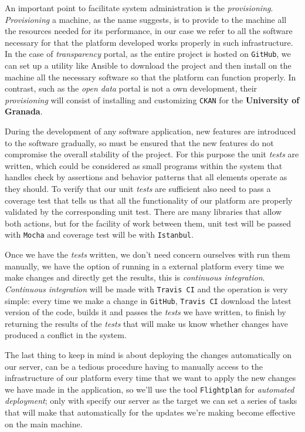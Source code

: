 {{\bigskip
An important point to facilitate system administration is the \textit{provisioning}. \textit{Provisioning} a machine, as the name suggests, is to provide to the machine all the resources needed for its performance, in our case we refer to all the software necessary for that the platform developed works properly in such infrastructure. In the case of \textit{transparency} portal, as the entire project is hosted on {\tt GitHub}, we can set up a utility like Ansible to download the project and then install on the machine all the necessary software so that the platform can function properly. In contrast, such as the \textit{open data} portal is not a own development, their \textit{provisioning} will consist of installing and customizing {\tt CKAN} for the \textbf {University of Granada}.

\bigskip
During the development of any software application, new features are introduced to the software gradually, so must be ensured that the new features do not compromise the overall stability of the project. For this purpose the unit \textit{tests} are written, which could be considered as small programs within the system that handles check by assertions and behavior patterns that all elements operate as they should. To verify that our unit \textit{tests} are sufficient also need to pass a coverage test that tells us that all the functionality of our platform are properly validated by the corresponding unit test. There are many libraries that allow both actions, but for the facility of work between them, unit test will be passed with {\tt Mocha} and coverage test will be with {\tt Istanbul}.

\bigskip
Once we have the \textit{tests} written, we don't need concern ourselves with run them manually, we have the option of running in a external platform every time we make changes and directly get the results, this is \textit{continuous integration}. \textit{Continuous integration} will be made with {\tt Travis CI} and the operation is very simple: every time we make a change in {\tt GitHub}, {\tt Travis CI} download the latest version of the code, builds it and passes the \textit{tests} we have written, to finish by returning the results of the \textit{tests} that will make us know whether changes have produced a conflict in the system. 

\bigskip
The last thing to keep in mind is about deploying the changes automatically on our server, can be a tedious procedure having to manually access to the infrastructure of our platform every time that we want to apply the new changes we have made in the application, so we'll use the tool {\tt Flightplan} for \textit{automated deployment}; only with specify our server as the target we can set a series of tasks that will make that automatically for the updates we're making become effective on the main machine.

}}
